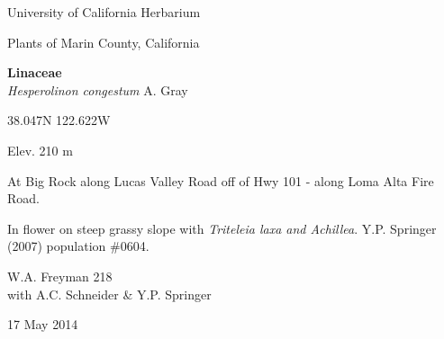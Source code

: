 \documentclass[letterpaper,10pt]{article}
\begin{document}
\begin{minipage}[t]{0.40\textwidth}

\begin{center}
University of California Herbarium \\
\begin{large}
Plants of Marin County, California \\
\end{large}
\vspace{\baselineskip}
\textbf{Linaceae} \\
\textit{Hesperolinon congestum} A. Gray\\
\end{center}

\begin{footnotesize}

\begin{multicols}{2}
38.047\textdegree N 122.622\textdegree W
\columnbreak
\begin{flushright}
Elev. 210 m
\end{flushright}
\end{multicols}

At Big Rock along Lucas Valley Road off of Hwy 101 - along Loma Alta Fire Road.
\vspace{\baselineskip}

In flower on steep grassy slope with \textit{Triteleia laxa and Achillea}. Y.P. Springer (2007) population \#0604.

\begin{multicols}{2}
W.A. Freyman 218 \\
with A.C. Schneider \& Y.P. Springer
\columnbreak
\begin{flushright}
17 May 2014
\end{flushright}
\end{multicols}

\end{footnotesize}

\end{minipage}
%
\hspace{2cm}
%
\end{document}
